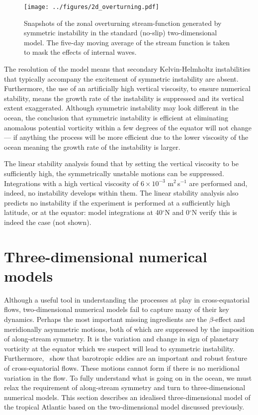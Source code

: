 \begin{figure}
    \centering
    \texttt{[image: ../figures/2d\_overturning.pdf]}
    \caption{Snapshots of the zonal overturning stream-function generated by symmetric instability in the standard (no-slip) two-dimensional model. The five-day moving average of the stream function is taken to mask the effects of internal waves.}
    \label{fig:2DStandardOverturningStreamfunction}
\end{figure}

The resolution of the model means that secondary Kelvin-Helmholtz instabilities that typically accompany the excitement of symmetric instability are absent. Furthermore, the use of an artificially high vertical viscosity, to ensure numerical stability,  means the growth rate of the instability is suppressed and its vertical extent exaggerated. Although symmetric instability may look different in the ocean, the conclusion that symmetric instability is efficient at eliminating anomalous potential vorticity within a few degrees of the equator will not change --- if anything the process will be more efficient due to the lower viscosity of the ocean meaning the growth rate of the instability is larger.

The linear stability analysis found that by setting the vertical viscosity to be sufficiently high, the symmetrically unstable motions can be suppressed. Integrations with a high vertical viscosity of $6 \times 10^{-3}$ m$^2$\,s$^{-1}$ are performed and, indeed, no instability develops within them. The linear stability analysis also predicts no instability if the experiment is performed at a sufficiently high latitude, or at the equator: model integrations at 40$^{\circ}$N and 0$^{\circ}$N verify this is indeed the case (not shown).

\section{Three-dimensional numerical models}
\label{sec:3DModels}
Although a useful tool in understanding the processes at play in cross-equatorial flows, two-dimensional numerical models fail to capture many of their key dynamics.
Perhaps the most important missing ingredients are the $\beta$-effect and meridionally asymmetric motions, both of which are suppressed by the imposition of along-stream symmetry. It is the variation and change in sign of planetary vorticity at the equator which we suspect will lead to symmetric instability. Furthermore,~\citet{Edwards1998II} show that barotropic eddies are an important and robust feature of cross-equatorial flows. These motions cannot form if there is no meridional variation in the flow. To fully understand what is going on in the ocean, we must relax the requirement of along-stream symmetry and turn to three-dimensional numerical models. This section describes an idealised three-dimensional model of the tropical Atlantic based on the two-dimensional model discussed previously.

